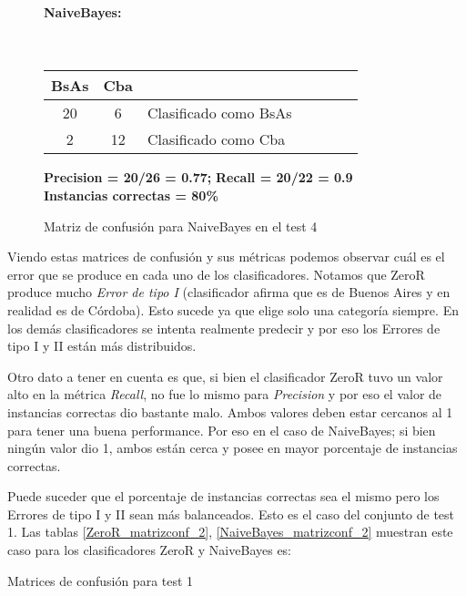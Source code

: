 \begin{figure}[H]
\centering
\paragraph*{NaiveBayes:}\mbox{}\\
\begin{table}[H]
\centering
\begin{tabular}{|c|c|l|c|c|c|c|}
\hline
 BsAs & Cba &  \\ \hline
 20 &  6 &  Clasificado como BsAs \\ \hline
 2  &  12 &  Clasificado como Cba \\ \hline
\end{tabular}
\end{table}
\begin{center}
\textbf{Precision = 20/26 = 0.77;} \textbf{Recall = 20/22 = 0.9}\\
\textbf{Instancias correctas = 80\%}
\end{center}
\caption{Matriz de confusión para NaiveBayes en el test 4}
\label{NaiveBayes_matrizconf}
\end{figure}

Viendo estas matrices de confusión y sus métricas podemos observar cuál es el error que se produce en cada uno de los clasificadores. Notamos que ZeroR produce mucho \textit{Error de tipo I} (clasificador afirma que es de Buenos Aires y en realidad es de Córdoba). Esto sucede ya que elige solo una categoría siempre. En los demás clasificadores se intenta realmente predecir y por eso los Errores de tipo I y II están más distribuidos.

Otro dato a tener en cuenta es que, si bien el clasificador ZeroR tuvo un valor alto en la métrica \textit{Recall}, no fue lo mismo para \textit{Precision} y por eso el valor de instancias correctas dio bastante malo. Ambos valores deben estar cercanos al 1 para tener una buena performance. Por eso en el caso de NaiveBayes; si bien ningún valor dio 1, ambos están cerca y posee en mayor porcentaje de instancias correctas.

Puede suceder que el porcentaje de instancias correctas sea el mismo pero los Errores de tipo I y II sean más balanceados. Esto es el caso del conjunto de test 1. Las tablas \ref{ZeroR_matrizconf_2}, \ref{NaiveBayes_matrizconf_2} muestran este caso para los clasificadores ZeroR y NaiveBayes es:

\begin{center}
\Large Matrices de confusión para test 1
\end{center}

